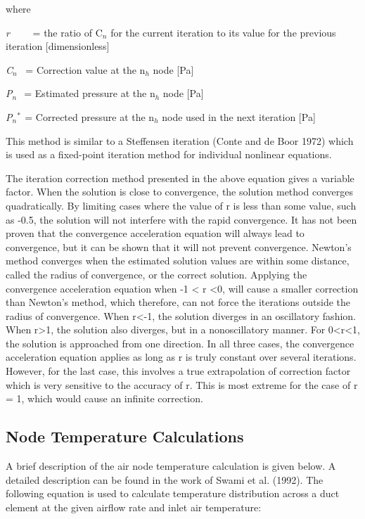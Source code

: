 where

\emph{r}~~~~ = the ratio of C\(_{n}\) for the current iteration to its value for the previous iteration {[}dimensionless{]}

\emph{C\(_{n}\)}~ = Correction value at the n\(_{h}\) node {[}Pa{]}

\emph{P\(_{n}\)} \(_{ }\) = Estimated pressure at the n\(_{h}\) node {[}Pa{]}

\emph{P\(_{n}\)\(^{*}\)}\(_{ }\) = Corrected pressure at the n\(_{h}\) node used in the next iteration {[}Pa{]}

This method is similar to a Steffensen iteration (Conte and de Boor 1972) which is used as a fixed-point iteration method for individual nonlinear equations.

The iteration correction method presented in the above equation gives a variable factor. When the solution is close to convergence, the solution method converges quadratically. By limiting cases where the value of r is less than some value, such as -0.5, the solution will not interfere with the rapid convergence. It has not been proven that the convergence acceleration equation will always lead to convergence, but it can be shown that it will not prevent convergence. Newton's method converges when the estimated solution values are within some distance, called the radius of convergence, or the correct solution. Applying the convergence acceleration equation when -1 \textless{} r \textless{}0, will cause a smaller correction than Newton's method, which therefore, can not force the iterations outside the radius of convergence. When r\textless{}-1, the solution diverges in an oscillatory fashion. When r\textgreater{}1, the solution also diverges, but in a nonoscillatory manner. For 0\textless{}r\textless{}1, the solution is approached from one direction. In all three cases, the convergence acceleration equation applies as long as r is truly constant over several iterations. However, for the last case, this involves a true extrapolation of correction factor which is very sensitive to the accuracy of r. This is most extreme for the case of r = 1, which would cause an infinite correction.

\subsection{Node Temperature Calculations}\label{node-temperature-calculations}

A brief description of the air node temperature calculation is given below. A detailed description can be found in the work of Swami et al. (1992). The following equation is used to calculate temperature distribution across a duct element at the given airflow rate and inlet air temperature:


